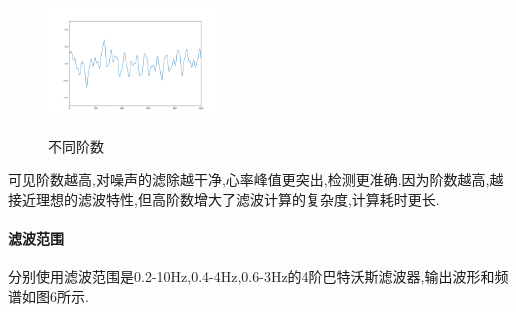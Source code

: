 \documentclass[12pt, a4paper, oneside]{ctexart}
\begin{document}
\begin{figure}[H]
{          \includegraphics[width=0.4\textwidth]{img/wave_fil_btws_6.png}}
        \caption{不同阶数}
        \label{fig:twopicture} 
      \end{figure}

      可见阶数越高,对噪声的滤除越干净,心率峰值更突出,检测更准确.因为阶数越高,越接近理想的滤波特性,但高阶数增大了滤波计算的复杂度,计算耗时更长.

      \newpage
      \paragraph{滤波范围}
      分别使用滤波范围是0.2-10Hz,0.4-4Hz,0.6-3Hz的4阶巴特沃斯滤波器,输出波形和频谱如图6所示.
\end{document}
